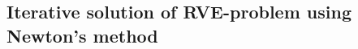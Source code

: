 \documentclass[12pt,a4paper,fleqn]{article}
\renewcommand{\ta}[1]{\mathbfit{#1}}
\renewcommand{\Box}{\mdlgwhtsquare}
\begin{document}
% 


\subsection{Iterative solution of RVE-problem using Newton's method}
\end{document}
